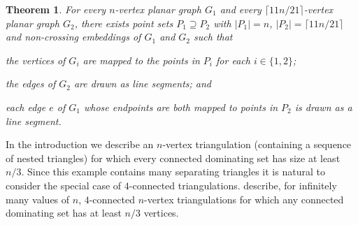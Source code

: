\documentclass{article}
\newcommand{\pat}[1]{\textcolor{red}{PM: #1}}
\newtheorem{thm}{Theorem}
\theoremstyle{definition}
\begin{document}

\begin{thm}\label{sefenomap}
  For every $n$-vertex planar graph $G_1$ and every $\lceil 11n/21\rceil$-vertex planar graph $G_2$, there exists point sets $P_1\supseteq P_2$ with $|P_1|=n$, $|P_2|=\lceil 11n/21\rceil$ and non-crossing embeddings of $G_1$ and $G_2$ such that
  \begin{compactenum}[(a)]
    \item the vertices of $G_i$ are mapped to the points in $P_i$ for each $i\in\{1,2\}$;
    \item the edges of $G_2$ are drawn as line segments; and
    \item each edge $e$ of $G_1$ whose endpoints are both mapped to points in $P_2$ is drawn as a line segment.
  \end{compactenum}
\end{thm}


In the introduction we describe an $n$-vertex triangulation (containing a sequence of nested triangles) for which every connected dominating set has size at least $n/3$.  Since this example contains many separating triangles it is natural to consider the special case of $4$-connected triangulations.  \citet{noguchi.zamfirescu:spanning} describe, for infinitely many values of $n$, $4$-connected $n$-vertex triangulations for which any connected dominating set has at least $n/3$ vertices.
\end{document}
